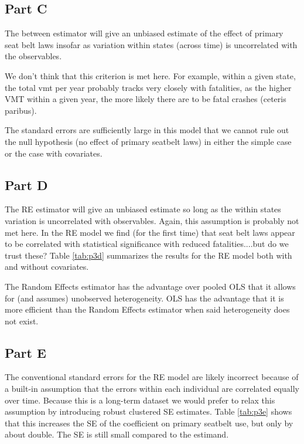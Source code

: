 \documentclass[letterpaper, 12pt]{article}
\begin{document}
\subsection{Part C}
The between estimator will give an unbiased estimate of the effect of primary seat belt laws insofar as variation within states (across time) is uncorrelated with the observables.


We don't think that this criterion is met here. For example, within a given state, the total vmt per year probably tracks very closely with fatalities, as the higher VMT within a given year, the more likely there are to be fatal crashes (ceteris paribus).  

The standard errors are sufficiently large in this model that we cannot rule out the null hypothesis (no effect of primary seatbelt laws) in either the simple case or the case with covariates. 

\subsection{Part D}
The RE estimator will give an unbiased estimate so long as the within states variation is uncorrelated with observables. Again, this assumption is probably not met here.  In the RE model we find (for the first time) that seat belt laws appear to be correlated with statistical significance with reduced fatalities....but do we trust these?  Table \ref{tab:p3d} summarizes the results for the RE model both with and without covariates.  


The Random Effects estimator has the advantage over pooled OLS that it allows for (and assumes) unobserved heterogeneity. OLS has the advantage that it is more efficient than the Random Effects estimator when said heterogeneity does not exist.

\subsection{Part E}

The conventional standard errors for the RE model are likely incorrect because of a built-in assumption that the errors within each individual are correlated equally over time.  Because this is a long-term dataset we would prefer to relax this assumption by introducing robust clustered SE estimates.  Table \ref{tab:p3e} shows that this increases the SE of the coefficient on primary seatbelt use, but only by about double.  The SE is still small compared to the estimand.
\end{document}
